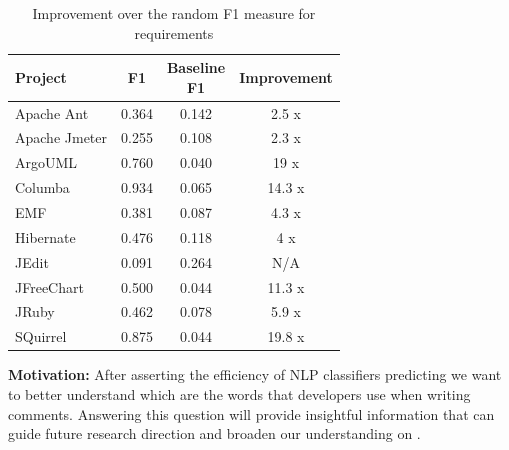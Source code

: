 \begin{table}[!hbt]
    \begin{center}
        \caption{Improvement over the random F1 measure for requirements}
        \label{tbl:improvement_f1measure_requirement}
        \begin{tabular}{l| c c c }
        \toprule
        \textbf{Project} & \textbf{F1} & \thead{Baseline\\F1} & \textbf{Improvement}\\
        \midrule
         Apache Ant      & 0.364 & 0.142  &  2.5  x\\
         Apache Jmeter   & 0.255 & 0.108  &  2.3  x\\
         ArgoUML         & 0.760 & 0.040  &  19   x\\
         Columba         & 0.934 & 0.065  &  14.3 x\\
         EMF             & 0.381 & 0.087  &  4.3  x\\
         Hibernate       & 0.476 & 0.118  &  4    x\\
         JEdit           & 0.091 & 0.264  &  N/A   \\
         JFreeChart      & 0.500 & 0.044  &  11.3 x\\
         JRuby           & 0.462 & 0.078  &  5.9  x\\
         SQuirrel        & 0.875 & 0.044  &  19.8 x\\
        \bottomrule
        \end{tabular}
    \end{center}    
\end{table}


\vspace{3mm}
\noindent\rqii
\vspace{3mm}

\noindent \textbf{Motivation:} After asserting the efficiency of NLP classifiers predicting \SATD we want to better understand which are the words that developers use when writing \SATD comments. Answering this question will provide insightful information that can guide future research direction and broaden our understanding on \SATD.     

